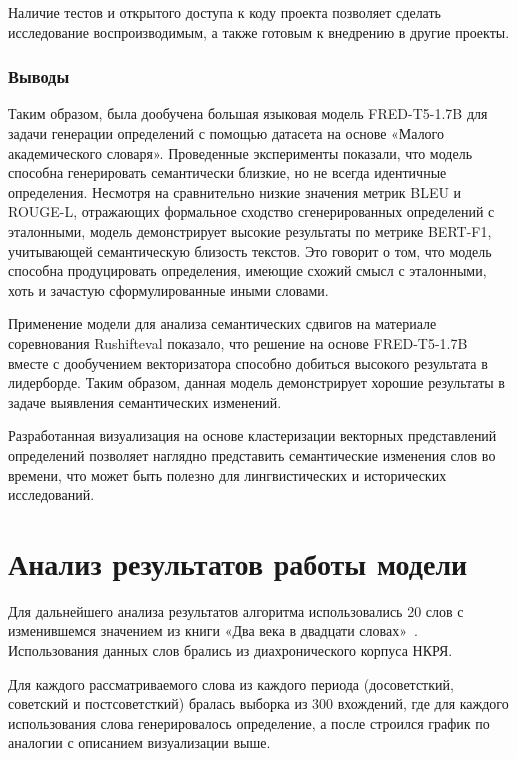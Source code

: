 \documentclass[LI,VKR]{HSEUniversity}
\begin{document}
Наличие тестов и открытого доступа к коду проекта позволяет
сделать исследование воспроизводимым, а также готовым к внедрению в другие проекты.

\subsection*{Выводы}

Таким образом, была дообучена большая языковая модель FRED-T5-1.7B для задачи
генерации определений с помощью датасета на основе «Малого академического словаря».
Проведенные эксперименты показали,
что модель способна генерировать семантически близкие,
но не всегда идентичные определения.
Несмотря на сравнительно низкие значения метрик BLEU и ROUGE-L,
отражающих формальное сходство сгенерированных определений с эталонными,
модель демонстрирует высокие результаты по метрике BERT-F1,
учитывающей семантическую близость текстов.
Это говорит о том, что модель способна продуцировать определения,
имеющие схожий смысл с эталонными, хоть и зачастую сформулированные иными словами.

Применение модели для анализа семантических сдвигов на материале соревнования Rushifteval показало,
что решение на основе FRED-T5-1.7B вместе с дообучением векторизатора способно добиться высокого
результата в лидерборде.
Таким образом, данная модель демонстрирует хорошие результаты в задаче выявления семантических изменений.

Разработанная визуализация на основе кластеризации векторных представлений определений позволяет
наглядно представить семантические изменения слов во времени,
что может быть полезно для лингвистических и исторических исследований.

\chapter{Анализ результатов работы модели}

Для дальнейшего анализа результатов алгоритма использовались 20 слов с изменившемся
значением из книги «Два века в двадцати словах»~\cite{TwoCenturies}.
Использования данных слов брались из диахронического корпуса НКРЯ.

Для каждого рассматриваемого слова из каждого периода (досоветсткий, советский и постсоветсткий)
бралась выборка из 300 вхождений,
где для каждого использования слова генерировалось определение, а после строился график по аналогии с
описанием визуализации выше.
\end{document}

